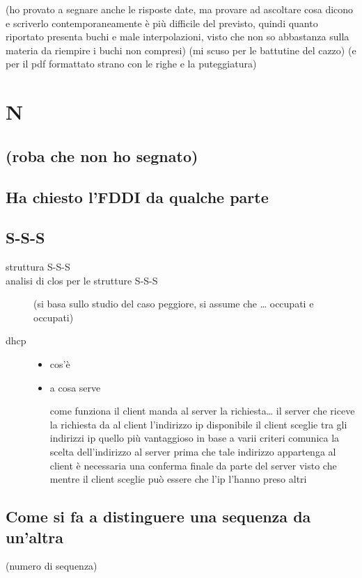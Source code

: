 \documentclass[11pt]{article}
\author{Biggie Dickus}
\date{\today}
\title{}
\begin{document}
\tableofcontents

(ho provato a segnare anche le risposte date, ma provare ad ascoltare cosa dicono e scriverlo contemporaneamente è più difficile del previsto, quindi quanto riportato presenta buchi e male interpolazioni, visto che non so abbastanza sulla materia da riempire i buchi non compresi)
(mi scuso per le battutine del cazzo)
(e per il pdf formattato strano con le righe e la puteggiatura)
\section{N}
\label{sec:org9e41c15}
\subsection{(roba che non ho segnato)}
\label{sec:org4b1b278}
\subsection{Ha chiesto l'FDDI da qualche parte}
\label{sec:org09df73d}
\subsection{S-S-S}
\label{sec:orgaab8ff2}
\begin{description}
\item[{struttura S-S-S}] 

\item[{analisi di clos per le strutture S-S-S}] (si basa sullo studio del caso peggiore, si assume che \ldots{} occupati e occupati)
\item[{dhcp}] \begin{itemize}
\item cos'è
\item a cosa serve
\item[{come funziona}] il client manda al server la richiesta\ldots{}
il server che riceve la richiesta da al client l'indirizzo ip disponibile
il client sceglie tra gli indirizzi ip quello più vantaggioso in base a varii criteri
comunica la scelta dell'indirizzo al server
prima che tale indirizzo appartenga al client è necessaria una conferma finale da parte del server visto che mentre il client sceglie può essere che l'ip l'hanno preso altri
\end{itemize}
\end{description}

\subsection{Come si fa a distinguere una sequenza da un'altra}
\label{sec:orgbc20248}
(numero di sequenza)
\end{document}
